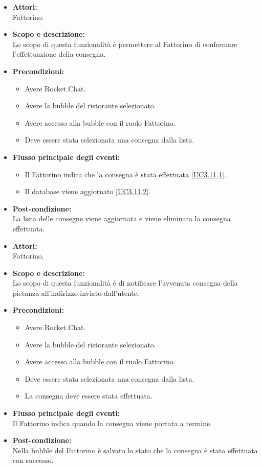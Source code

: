 \begin{itemize}
	\item \textbf{Attori:}
	\\Fattorino.
	\item \textbf{Scopo e descrizione:} 
	\\Lo scopo di questa funzionalità è permettere al Fattorino di confermare l'effettuazione della consegna.
	\item \textbf{Precondizioni:}
	\begin{itemize}
		\item Avere Rocket.Chat.
		\item Avere la bubble del ristorante selezionato.
		\item Avere accesso alla bubble con il ruolo Fattorino.
		\item Deve essere stata selezionata una consegna dalla lista.
	\end{itemize}
	\item \textbf{Flusso principale degli eventi:}
	\begin{itemize}
		\item Il Fattorino indica che la consegna è stata effettuata \ref{UC3.11.1}.
		\item Il database viene aggiornato \ref{UC3.11.2}.
	\end{itemize}
	\item \textbf{Post-condizione:}
	\\La lista delle consegne viene aggiornata e viene eliminata la consegna effettuata.
\end{itemize}


\begin{itemize}
	\item \textbf{Attori:}
	\\Fattorino.
	\item \textbf{Scopo e descrizione:} 
	\\Lo scopo di questa funzionalità è di notificare l'avvenuta consegna della pietanza all'indirizzo inviato dall'utente.
	\item \textbf{Precondizioni:}
	\begin{itemize}
		\item Avere Rocket.Chat.
		\item Avere la bubble del ristorante selezionato.
		\item Avere accesso alla bubble con il ruolo Fattorino.
		\item Deve essere stata selezionata una consegna dalla lista.
		\item La consegna deve essere stata effettuata.
	\end{itemize}
	\item \textbf{Flusso principale degli eventi:}
	\\Il Fattorino indica quando la consegna viene portata a termine.
	\item \textbf{Post-condizione:}
	\\Nella bubble del Fattorino è salvato lo stato che la consegna è stata effettuata con successo.
\end{itemize}

